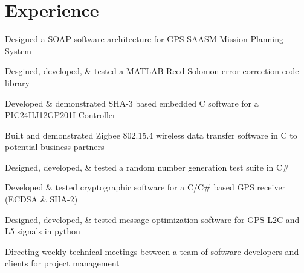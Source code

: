 \documentclass{deedy-resume} %
\begin{document}
\begin{minipage}[t]{0.66\textwidth} %


\section{Experience}


\vspace{\topsep} %
\begin{tightitemize}
\item Designed a SOAP software architecture for GPS SAASM Mission Planning System
\item Desgined, developed, \& tested a MATLAB Reed-Solomon error correction code library
\item Developed \& demonstrated SHA-3 based embedded C software for a PIC24HJ12GP201I Controller
\item Built and demonstrated Zigbee 802.15.4 wireless data transfer software in C to potential business partners
\item Designed, developed, \& tested a random number generation test suite in C\#
\item Developed \& tested cryptographic software for a C/C\# based GPS receiver (ECDSA \& SHA-2)
\item Designed, developed, \& tested message optimization software for GPS L2C and L5 signals in python
\item Directing weekly technical meetings between a team of software developers and clients for project management


\end{tightitemize}
\end{minipage}
\end{document}
